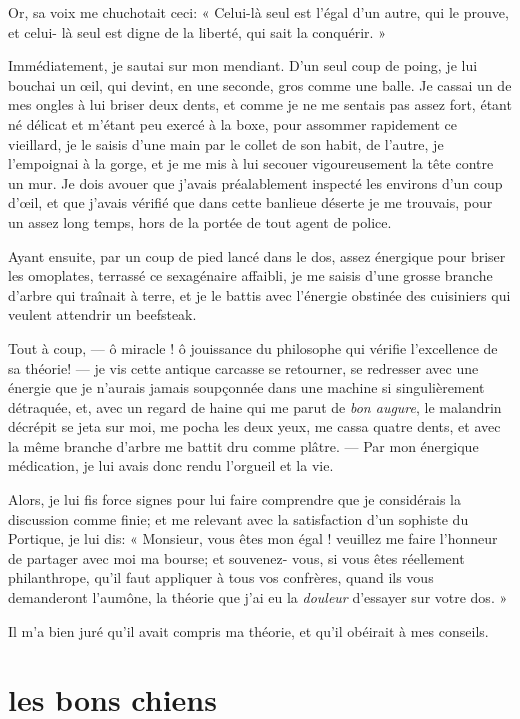 Or, sa voix me chuchotait ceci: « Celui{}-là seul est
l’égal d’un autre, qui le prouve, et
celui{}- là seul est digne de la liberté, qui sait la conquérir. »

Immédiatement, je sautai sur mon mendiant. D’un seul
coup de poing, je lui bouchai un \oe il, qui devint, en une seconde, gros
comme une balle. Je cassai un de mes ongles à lui briser deux dents, et
comme je ne me sentais pas assez fort, étant né délicat et
m’étant peu exercé à la boxe, pour assommer rapidement
ce vieillard, je le saisis d’une main par le collet de
son habit, de l’autre, je l’empoignai
à la gorge, et je me mis à lui secouer vigoureusement la tête contre un
mur. Je dois avouer que j’avais préalablement inspecté
les environs d’un coup d’\oe il, et que
j’avais vérifié que dans cette banlieue déserte je me
trouvais, pour un assez long temps, hors de la portée de tout agent de
police.

Ayant ensuite, par un coup de pied lancé dans le dos, assez énergique
pour briser les omoplates, terrassé ce sexagénaire affaibli, je me
saisis d’une grosse branche d’arbre
qui traînait à terre, et je le battis avec l’énergie
obstinée des cuisiniers qui veulent attendrir un beefsteak.

Tout à coup, --- ô miracle ! ô jouissance du philosophe qui vérifie
l’excellence de sa théorie! --- je vis cette antique
carcasse se retourner, se redresser avec une énergie que je
n’aurais jamais soupçonnée dans une machine si
singulièrement détraquée, et, avec un regard de haine qui me parut de
\textit{bon augure}, le malandrin décrépit se jeta sur moi, me pocha les deux
yeux, me cassa quatre dents, et avec la même branche
d’arbre me battit dru comme plâtre. --- Par mon
énergique médication, je lui avais donc rendu
l’orgueil et la vie.

Alors, je lui fis force signes pour lui faire comprendre que je
considérais la discussion comme finie; et me relevant avec la
satisfaction d’un sophiste du Portique, je lui dis: «
Monsieur, vous êtes mon égal ! veuillez me faire
l’honneur de partager avec moi ma bourse; et
souvenez{}- vous, si vous êtes réellement philanthrope,
qu’il faut appliquer à tous vos confrères, quand ils
vous demanderont l’aumône, la théorie que
j’ai eu la \textit{douleur} d’essayer sur
votre dos. »

Il m’a bien juré qu’il avait compris
ma théorie, et qu’il obéirait à mes conseils.

\quebra\section[Les bons chiens]{les bons chiens }

